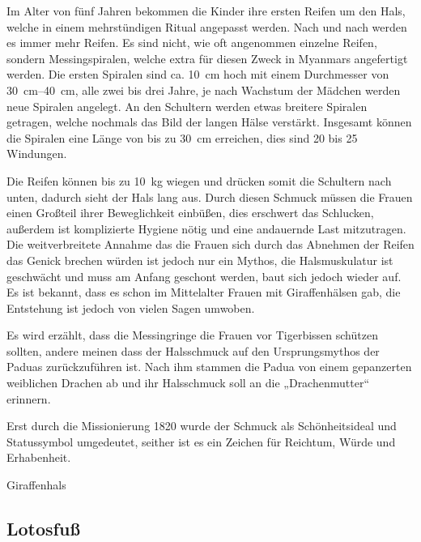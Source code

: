 Im Alter von fünf Jahren bekommen die Kinder ihre ersten Reifen um den Hals, welche in einem
mehrstündigen Ritual angepasst werden. Nach und nach werden es immer mehr Reifen. Es sind nicht, wie
oft angenommen einzelne Reifen, sondern Messingspiralen, welche extra für diesen Zweck in Myanmars
angefertigt werden. Die ersten Spiralen sind ca. \SI{10}{\centi\metre} hoch mit einem Durchmesser von
\SIrange{30}{40}{\centi\metre}, alle zwei bis drei Jahre, je nach Wachstum der Mädchen werden neue
Spiralen angelegt. An den Schultern werden etwas breitere Spiralen getragen, welche nochmals das Bild
der langen Hälse verstärkt. Insgesamt können die Spiralen eine Länge von bis zu \SI{30}{\centi\metre}
erreichen, dies sind 20 bis 25 Windungen.

Die Reifen können bis zu \SI{10}{\kilo\gram} wiegen und drücken somit die Schultern nach unten,
dadurch sieht der Hals lang aus. Durch diesen Schmuck müssen die Frauen einen Großteil ihrer
Beweglichkeit einbüßen, dies erschwert das Schlucken, außerdem ist komplizierte Hygiene nötig und
eine andauernde Last mitzutragen. Die weitverbreitete Annahme das die Frauen sich durch das Abnehmen
der Reifen das Genick brechen würden ist jedoch nur ein Mythos, die Halsmuskulatur ist geschwächt und
muss am Anfang geschont werden, baut sich jedoch wieder auf. Es ist bekannt, dass es schon im
Mittelalter Frauen mit Giraffenhälsen gab, die Entstehung ist jedoch von vielen Sagen umwoben.

Es wird erzählt, dass die Messingringe die Frauen vor Tigerbissen schützen sollten, andere meinen
dass der Halsschmuck auf den Ursprungsmythos der Paduas zurückzuführen ist. Nach ihm stammen die
Padua von einem gepanzerten weiblichen Drachen ab und ihr Halsschmuck soll an die „Drachenmutter“
erinnern.

Erst durch die Missionierung 1820 wurde der Schmuck als Schönheitsideal und Statussymbol umgedeutet,
seither ist es ein Zeichen für Reichtum, Würde und Erhabenheit.

\begin{figurewrapper} %
	 \hfill
	\caption{Giraffenhals}
\end{figurewrapper}

\subsection{Lotosfuß}

